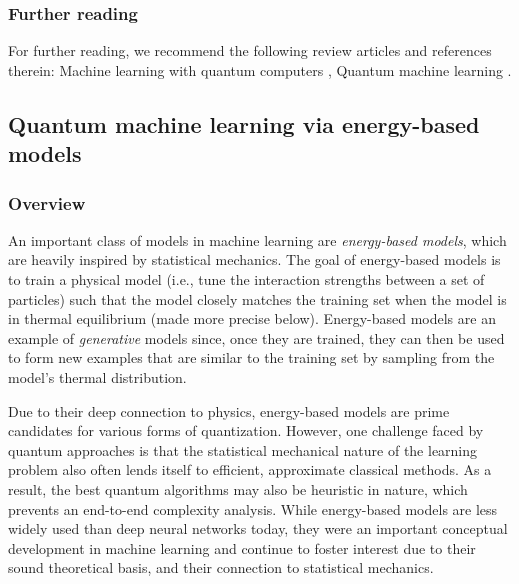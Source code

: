 \begin{refsection}
\subsubsection{Further reading}
For further reading, we recommend the following review articles and references therein: Machine learning with quantum computers \cite{schuld2021machineLearning}, Quantum machine learning  \cite{biamonte2016QuantumMachineLearning}.
\printbibliography[heading=secbib,segment=\therefsegment]
\end{refsection}

\newpage

\begin{refsection}

\subsection{Quantum machine learning via energy-based models}
\label{appl:EnergyBasedML}


\subsubsection*{Overview}
An important class of models in machine learning are \textit{energy-based models}, which are heavily inspired by statistical mechanics. The goal of energy-based models is to train a physical model (i.e., tune the interaction strengths between a set of particles) such that the model closely matches the training set when the model is in thermal equilibrium (made more precise below). Energy-based models are an example of \textit{generative} models since, once they are trained, they can then be used to form new examples that are similar to the training set by sampling from the model's thermal distribution. 

Due to their deep connection to physics, energy-based models are prime candidates for various forms of quantization. However, one challenge faced by quantum approaches is that the statistical mechanical nature of the learning problem also often lends itself to efficient, approximate classical methods. As a result, the best quantum algorithms may also be heuristic in nature, which prevents an end-to-end complexity analysis.
While energy-based models are less widely used than deep neural networks today, they were an important conceptual development in machine learning \cite{salakhutdinov2010efficient} and continue to foster interest due to their sound theoretical basis, and their connection to statistical mechanics. 



\end{refsection}
